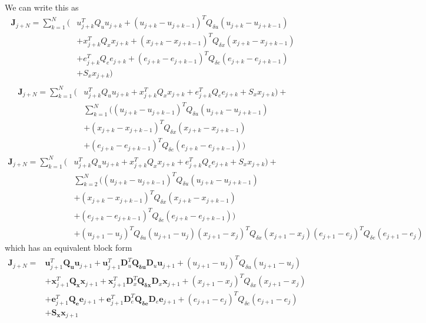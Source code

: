 \documentclass[landscape]{article}
\begin{document}
We can write this as
\begin{align}
\mathbf{J}_{j+N} 
= \sum_{k=1}^{N}(
&   u_{j+k}^T Q_u u_{j+k} + \left(u_{j+k}-u_{j+k-1}\right)^T Q_{\delta u} \left(u_{j+k}-u_{j+k-1}\right) \\
& + x_{j+k}^T Q_x x_{j+k} + \left(x_{j+k}-x_{j+k-1}\right)^T Q_{\delta x} \left(x_{j+k}-x_{j+k-1}\right) \\
& + e_{j+k}^T Q_e e_{j+k} + \left(e_{j+k}-e_{j+k-1}\right)^T Q_{\delta e} \left(e_{j+k}-e_{j+k-1}\right) \\
& + S_x x_{j+k})\\
\end{align}
\begin{align}
\mathbf{J}_{j+N} 
= \sum_{k=1}^{N}(
&   u_{j+k}^T Q_u u_{j+k} 
  + x_{j+k}^T Q_x x_{j+k} 
  + e_{j+k}^T Q_e e_{j+k}
  + S_x x_{j+k}) +\\
&\sum_{k=1}^{N}(
  \left(u_{j+k}-u_{j+k-1}\right)^T Q_{\delta u} \left(u_{j+k}-u_{j+k-1}\right) \\
& + \left(x_{j+k}-x_{j+k-1}\right)^T Q_{\delta x} \left(x_{j+k}-x_{j+k-1}\right) \\
& + \left(e_{j+k}-e_{j+k-1}\right)^T Q_{\delta e} \left(e_{j+k}-e_{j+k-1}\right) 
)
\end{align}
\begin{align}
\mathbf{J}_{j+N} 
= \sum_{k=1}^{N}(
&   u_{j+k}^T Q_u u_{j+k} 
+ x_{j+k}^T Q_x x_{j+k} 
+ e_{j+k}^T Q_e e_{j+k}
+ S_x x_{j+k}) +\\
&\sum_{k=2}^{N}(
\left(u_{j+k}-u_{j+k-1}\right)^T Q_{\delta u} \left(u_{j+k}-u_{j+k-1}\right) \\
& + \left(x_{j+k}-x_{j+k-1}\right)^T Q_{\delta x} \left(x_{j+k}-x_{j+k-1}\right) \\
& + \left(e_{j+k}-e_{j+k-1}\right)^T Q_{\delta e} \left(e_{j+k}-e_{j+k-1}\right) 
)\\
&+
(u_{j+1}-u_{j})^T Q_{\delta u} (u_{j+1}-u_{j})
(x_{j+1}-x_{j})^T Q_{\delta x} (x_{j+1}-x_{j})
(e_{j+1}-e_{j})^T Q_{\delta e} (e_{j+1}-e_{j})
\end{align}
which has an equivalent block form
\begin{equation}
\begin{split}
\mathbf{J}_{j+N} = 
& \mathbf{u}_{j+1}^T \mathbf{Q_u} \mathbf{u}_{j+1} + \mathbf{u}_{j+1}^T \mathbf{D}_u^T \mathbf{Q_{\delta u}} \mathbf{D}_u \mathbf{u}_{j+1} + \left(u_{j+1}-u_j\right)^T Q_{\delta u} \left(u_{j+1}-u_j\right)\\
&+\mathbf{x}_{j+1}^T \mathbf{Q_x} \mathbf{x}_{j+1} + \mathbf{x}_{j+1}^T \mathbf{D}_x^T \mathbf{Q_{\delta x}} \mathbf{D}_x \mathbf{x}_{j+1} + \left(x_{j+1}-x_j\right)^T Q_{\delta x} \left(x_{j+1}-x_j\right)\\
&+\mathbf{e}_{j+1}^T \mathbf{Q_e} \mathbf{e}_{j+1} + \mathbf{e}_{j+1}^T \mathbf{D}_e^T \mathbf{Q_{\delta e}} \mathbf{D}_e \mathbf{e}_{j+1} + \left(e_{j+1}-e_j\right)^T Q_{\delta e} \left(e_{j+1}-e_j\right)\\
&+\mathbf{S_x}\mathbf{x}_{j+1}
\end{split}
\end{equation}
\end{document}
